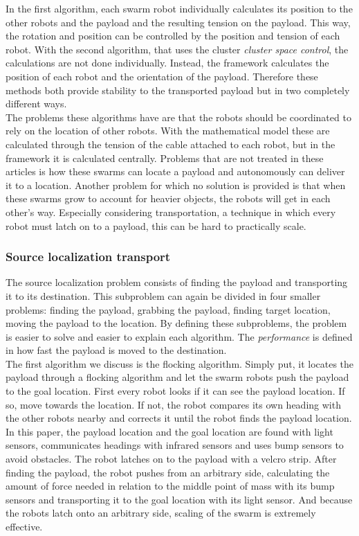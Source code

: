 In the first algorithm, each swarm robot individually calculates its position to the other robots and the payload and the resulting tension on the payload.
This way, the rotation and position can be controlled by the position and tension of each robot.
With the second algorithm, that uses the cluster \emph{cluster space control}, the calculations are not done individually.
Instead, the framework calculates the position of each robot and the orientation of the payload.
Therefore these methods both provide stability to the transported payload but in two completely different ways.\\

The problems these algorithms have are that the robots should be coordinated to rely on the location of other robots.
With the mathematical model these are calculated through the tension of the cable attached to each robot, but in the framework it is calculated centrally.
Problems that are not treated in these articles is how these swarms can locate a payload and autonomously can deliver it to a location.
Another problem for which no solution is provided is that when these swarms grow to account for heavier objects, the robots will get in each other's way.
Especially considering transportation, a technique in which every robot must latch on to a payload, this can be hard to practically scale.

\subsubsection{Source localization transport}
The source localization problem consists of finding the payload and transporting it to its destination.
This subproblem can again be divided in four smaller problems: finding the payload, grabbing the payload, finding target location, moving the payload to the location.
By defining these subproblems, the problem is easier to solve and easier to explain each algorithm.
The \emph{performance} is defined in how fast the payload is moved to the destination.\\

The first algorithm we discuss is the flocking algorithm. \cite{Rubenstein2013collecive}
Simply put, it locates the payload through a flocking algorithm and let the swarm robots push the payload to the goal location.
First every robot looks if it can see the payload location. If so, move towards the location.
If not, the robot compares its own heading with the other robots nearby and corrects it until the robot finds the payload location.
In this paper, the payload location and the goal location are found with light sensors, communicates headings with infrared sensors and uses bump sensors to avoid obstacles.
The robot latches on to the payload with a velcro strip.
After finding the payload, the robot pushes from an arbitrary side, calculating the amount of force needed in relation to the middle point of mass with its bump sensors and transporting it to the goal location with its light sensor.
And because the robots latch onto an arbitrary side, scaling of the swarm is extremely effective.\\


